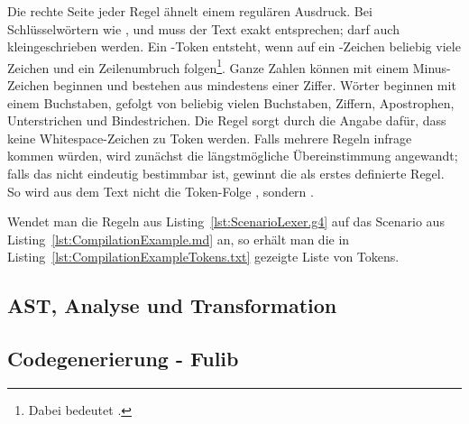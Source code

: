 Die rechte Seite jeder Regel ähnelt einem regulären Ausdruck.
Bei Schlüsselwörtern wie ,  und  muss der Text exakt entsprechen;
 darf auch kleingeschrieben werden.
Ein -Token entsteht, wenn auf ein \code{#}-Zeichen beliebig viele Zeichen und ein Zeilenumbruch folgen\footnote{
Dabei bedeutet  .}.
Ganze Zahlen können mit einem Minus-Zeichen beginnen und bestehen aus mindestens einer Ziffer.
Wörter beginnen mit einem Buchstaben, gefolgt von beliebig vielen Buchstaben, Ziffern, Apostrophen, Unterstrichen und Bindestrichen.
Die Regel  sorgt durch die Angabe  dafür, dass keine Whitespace-Zeichen zu Token werden.
Falls mehrere Regeln infrage kommen würden, wird zunächst die längstmögliche Übereinstimmung angewandt;
falls das nicht eindeutig bestimmbar ist, gewinnt die als erstes definierte Regel.
So wird aus dem Text  nicht die Token-Folge , sondern .

Wendet man die Regeln aus Listing~\ref{lst:ScenarioLexer.g4} auf das Scenario aus Listing~\ref{lst:CompilationExample.md} an,
so erhält man die in Listing~\ref{lst:CompilationExampleTokens.txt} gezeigte Liste von Tokens.



\subsection{AST, Analyse und Transformation}\label{subsec:data-model-gentreesrc}


\subsection{Codegenerierung - Fulib}\label{subsec:codegen-fulib}

